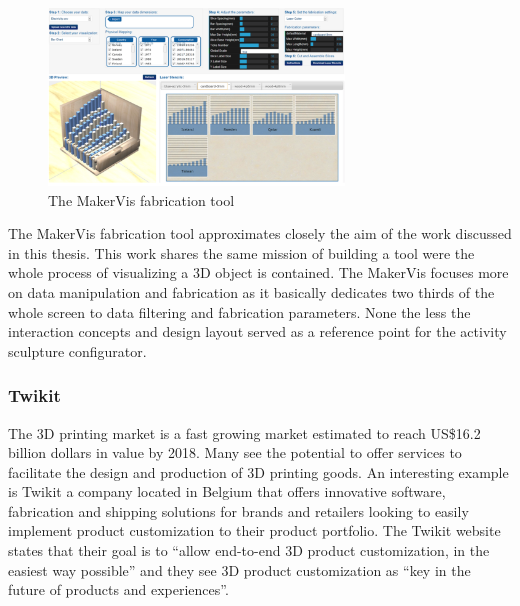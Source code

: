 \documentclass[../medieninformatik-arbeit.tex]{subfiles}
\begin{document}
\begin{figure}[h]
\begin{center}
  \includegraphics[width=0.7\textwidth]{RelatedWork/img/MakerVis}
  \caption{The MakerVis fabrication tool\cite{swaminathan2014supporting} }
\label{fig:makervis-config}
\end{center}
\end{figure}

The MakerVis fabrication tool approximates closely the aim of the work discussed in this thesis. This work shares the same mission of building a tool were the whole process of visualizing a 3D object is contained. The MakerVis focuses more on data manipulation and fabrication as it basically dedicates two thirds of the whole screen to data filtering and fabrication parameters. None the less the interaction concepts and design layout served as a reference point for the activity sculpture configurator. 

\subsubsection{Twikit}
The 3D printing market is a fast growing market estimated to reach US\$16.2 billion dollars in value by 2018\cite{canalys2014trends}. Many see the potential to offer services to facilitate the design and production of 3D printing goods. An interesting example is 
Twikit\cite{twikit2015tech} a company located in Belgium that offers innovative software, fabrication and shipping solutions for brands and retailers looking to easily implement product customization to their product portfolio. The Twikit website\cite{twikit2015tech} states that their goal is to ``allow end-to-end 3D product customization, in the easiest way possible'' and they see 3D product customization as ``key in the future of products and experiences''.
\end{document}
